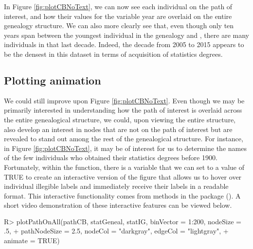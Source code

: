 \documentclass[article,shortnames]{jss}
\begin{document}
In Figure \ref{fig:plotCBNoText}, we can now see each individual on the path of interest, and how their values for the variable year are overlaid on the entire genealogy structure. We can also more clearly see that, even though only ten years span between the youngest individual in the genealogy and , there are many individuals in that last decade. Indeed, the decade from 2005 to 2015 appears to be the densest in this dataset in terms of acquisition of statistics degrees.

\subsection{Plotting animation}
\label{interaction}

We could still improve upon Figure \ref{fig:plotCBNoText}. Even though we may be primarily interested in understanding how the path of interest is overlaid across the entire genealogical structure, we could, upon viewing the entire structure, also develop an interest in nodes that are not on the path of interest but are revealed to stand out among the rest of the genealogical structure. For instance, in Figure \ref{fig:plotCBNoText}, it may be of interest for us to determine the names of the few individuals who obtained their statistics degrees before 1900. Fortunately, within the  function, there is a variable  that we can set to a value of TRUE to create an interactive version of the figure that allows us to hover over individual illegible labels and immediately receive their labels in a readable format. This interactive functionality comes from methods in the  package (\citealt{plotly}). A short video demonstration of these interactive features can be viewed below. 

\begin{CodeChunk}
\begin{CodeInput}
R> plotPathOnAll(pathCB, statGeneal, statIG, binVector = 1:200, nodeSize = .5,
+    pathNodeSize = 2.5, nodeCol = "darkgray", edgeCol = "lightgray",
+    animate = TRUE)
\end{CodeInput}
\end{CodeChunk}
\end{document}
